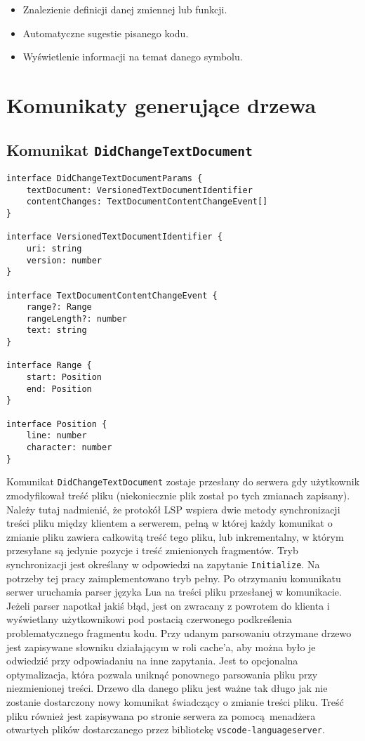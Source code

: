 \begin{itemize}
    \item Znalezienie definicji danej zmiennej lub funkcji.
    \item Automatyczne sugestie pisanego kodu.
    \item Wyświetlenie informacji na temat danego symbolu.
\end{itemize}

\section{Komunikaty generujące drzewa}
\subsection{Komunikat \texttt{DidChangeTextDocument}}
\begin{lstlisting}[title=Struktura argumentu komunikatu]
interface DidChangeTextDocumentParams {
    textDocument: VersionedTextDocumentIdentifier
    contentChanges: TextDocumentContentChangeEvent[]
}

interface VersionedTextDocumentIdentifier {
    uri: string
    version: number
}

interface TextDocumentContentChangeEvent {
    range?: Range
    rangeLength?: number
    text: string
}

interface Range {
    start: Position
    end: Position
}

interface Position {
    line: number
    character: number
}
\end{lstlisting}

Komunikat \texttt{DidChangeTextDocument} zostaje przesłany do serwera gdy użytkownik zmodyfikował treść pliku (niekoniecznie plik został po tych zmianach zapisany). Należy tutaj nadmienić, że protokół LSP wspiera dwie metody synchronizacji treści pliku między klientem a serwerem, pełną w której każdy komunikat o zmianie pliku zawiera całkowitą treść tego pliku, lub inkrementalny, w którym przesyłane są jedynie pozycje i treść zmienionych fragmentów. Tryb synchronizacji jest określany w odpowiedzi na zapytanie \texttt{Initialize}. Na potrzeby tej pracy zaimplementowano tryb pełny. Po otrzymaniu komunikatu serwer uruchamia parser języka Lua na treści pliku przesłanej w komunikacie. Jeżeli parser napotkał jakiś błąd, jest on zwracany z powrotem do klienta i wyświetlany użytkownikowi pod postacią czerwonego podkreślenia problematycznego fragmentu kodu. Przy udanym parsowaniu otrzymane drzewo jest zapisywane słowniku działającym w roli cache'a, aby można było je odwiedzić przy odpowiadaniu na inne zapytania. Jest to opcjonalna optymalizacja, która pozwala uniknąć ponownego parsowania pliku przy niezmienionej treści. Drzewo dla danego pliku jest ważne tak długo jak nie zostanie dostarczony nowy komunikat świadczący o zmianie treści pliku. Treść pliku również jest zapisywana po stronie serwera za pomocą menadżera otwartych plików dostarczanego przez bibliotekę \texttt{vscode-languageserver}.

